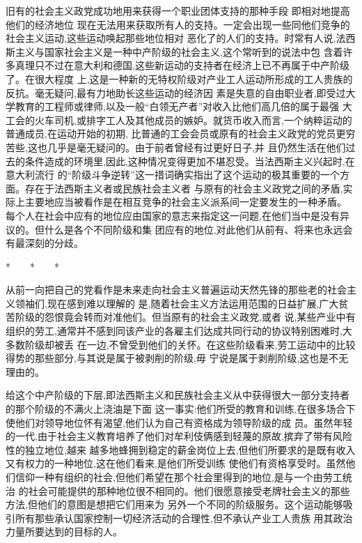 ﻿\documentclass[12pt]{article}
\begin{document}
旧有的社会主义政党成功地用来获得一个职业团体支持的那种手段 \myrule 即相对地提高他们的经济地位
\myrule 现在无法用来获取所有人的支持。一定会出现一些同他们竞争的社会主义运动,这些运动唤起那些地位相对
恶化了的人们的支持。时常有人说,法西斯主义与国家社会主义是一种中产阶级的社会主义,这个常听到的说法中包
含着许多真理\myrule 只不过在意大利和德国,这些新运动的支持者在经济上已不再属于中产阶级了。在很大程度
上,这是一种新的无特权阶级对产业工人运动所形成的工人贵族的反抗。毫无疑问,最有力地助长这些运动的经济因
素是失意的自由职业者,即受过大学教育的工程师或律师,以及一般``白领无产者''对收入比他们高几倍的属于最强
大工会的火车司机,或排字工人及其他成员的嫉妒。就货币收入而言,一个纳粹运动的普通成员,在运动开始的初期,
比普通的工会会员或原有的社会主义政党的党员更穷苦些,这也几乎是毫无疑问的。由于前者曾经有过更好日子,并
且仍然生活在他们过去的条件造成的环境里,因此,这种情况变得更加不堪忍受。当法西斯主义兴起时,在意大利流行
的``阶级斗争逆转''这一措词确实指出了这个运动的极其重要的一个方面。存在于法西斯主义者或民族社会主义者
与原有的社会主义政党之间的矛盾,实际上主要地应当被看作是在相互竞争的社会主义派系间一定要发生的一种矛盾。
每个人在社会中应有的地位应由国家的意志来指定这一问题,在他们当中是没有异议的。但什么是各个不同阶级和集
团应有的地位,对此他们从前有、将来也永远会有最深刻的分歧。

*　　*　　*

从前一向把自己的党看作是未来走向社会主义普遍运动天然先锋的那些老的社会主义领袖们,现在感到难以理解的
是,随着社会主义方法运用范围的日益扩展,广大贫苦阶级的怨恨竟会转而对准他们。但当原有的社会主义政党,或者
说,某些产业中有组织的劳工,通常并不感到同该产业的各雇主们达成共同行动的协议特别困难时,大多数阶级却被丢
在一边,不曾受到他们的关怀。在这些阶级看来,劳工运动中的比较得势的那些部分,与其说是属于被剥削的阶级,毋
宁说是属于剥削阶级,这也是不无理由的。

给这个中产阶级的下层,即法西斯主义和民族社会主义从中获得很大一部分支持者的那个阶级的不满火上浇油是下面
这一事实:他们所受的教育和训练,在很多场合下使他们对领导地位怀有渴望,他们认为自己有资格成为领导阶级的成
员。虽然年轻的一代,由于社会主义教育培养了他们对牟利伎俩感到轻蔑的原故,摈弃了带有风险性的独立地位,越来
越多地蜂拥到稳定的薪金岗位上去,但他们所要求的是既有收入又有权力的一种地位,这在他们看来,是他们所受训练
使他们有资格享受时。虽然他们信仰一种有组织的社会,但他们希望在那个社会里得到的地位,是与一个由劳工统治
的社会可能提供的那种地位很不相同的。他们很愿意接受老牌社会主义的那些方法,但他们的意图是想把它们用来为
另外一个不同的阶级服务。这个运动能够吸引所有那些承认国家控制一切经济活动的合理性,但不承认产业工人贵族
用其政治力量所要达到的目标的人。
\end{document}
